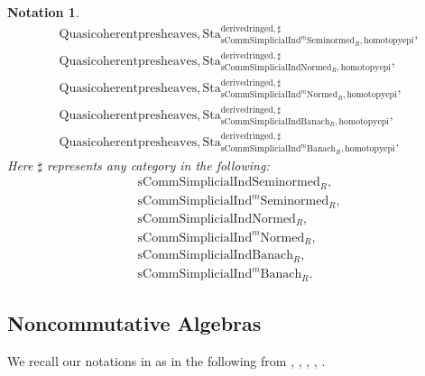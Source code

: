 \documentclass[12pt]{book}
\newtheorem{notation}{Notation}
\begin{document}
\begin{notation}
\begin{align}
&\mathrm{Quasicoherentpresheaves,Sta}^\mathrm{derivedringed,\sharp}_{\mathrm{sComm}\mathrm{Simplicial}\mathrm{Ind}^m\mathrm{Seminormed}_R,\mathrm{homotopyepi}},\\
&\mathrm{Quasicoherentpresheaves,Sta}^\mathrm{derivedringed,\sharp}_{\mathrm{sComm}\mathrm{Simplicial}\mathrm{Ind}\mathrm{Normed}_R,\mathrm{homotopyepi}},\\
&\mathrm{Quasicoherentpresheaves,Sta}^\mathrm{derivedringed,\sharp}_{\mathrm{sComm}\mathrm{Simplicial}\mathrm{Ind}^m\mathrm{Normed}_R,\mathrm{homotopyepi}},\\
&\mathrm{Quasicoherentpresheaves,Sta}^\mathrm{derivedringed,\sharp}_{\mathrm{sComm}\mathrm{Simplicial}\mathrm{Ind}\mathrm{Banach}_R,\mathrm{homotopyepi}},\\
&\mathrm{Quasicoherentpresheaves,Sta}^\mathrm{derivedringed,\sharp}_{\mathrm{sComm}\mathrm{Simplicial}\mathrm{Ind}^m\mathrm{Banach}_R,\mathrm{homotopyepi}}.	
\end{align}
Here $\sharp$ represents any category in the following:
\begin{align}
&\mathrm{sComm}\mathrm{Simplicial}\mathrm{Ind}\mathrm{Seminormed}_R,\\
&\mathrm{sComm}\mathrm{Simplicial}\mathrm{Ind}^m\mathrm{Seminormed}_R,\\
&\mathrm{sComm}\mathrm{Simplicial}\mathrm{Ind}\mathrm{Normed}_R,\\
&\mathrm{sComm}\mathrm{Simplicial}\mathrm{Ind}^m\mathrm{Normed}_R,\\
&\mathrm{sComm}\mathrm{Simplicial}\mathrm{Ind}\mathrm{Banach}_R,\\
&\mathrm{sComm}\mathrm{Simplicial}\mathrm{Ind}^m\mathrm{Banach}_R.	
\end{align} 
\end{notation}


\newpage
\subsection{Noncommutative Algebras}

\indent We recall our notations in \cite{T2} as in the following from \cite{BK}, \cite{BBK}, \cite{BBBK}, \cite{BBM}, \cite{KKM}.
\end{document}
